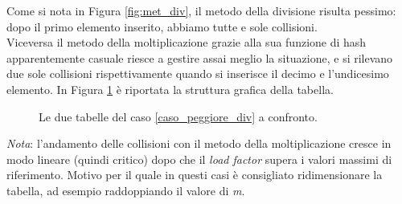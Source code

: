 Come si nota in Figura \ref{fig:met_div}, il metodo della divisione risulta pessimo: dopo il primo elemento inserito, abbiamo tutte e sole collisioni.
\\ Viceversa il metodo della moltiplicazione grazie alla sua funzione di hash apparentemente casuale riesce a gestire assai meglio la situazione, e si rilevano due sole collisioni rispettivamente quando si inserisce il decimo e l'undicesimo elemento. In Figura \ref{fig:tikz:worstcase} è riportata la struttura grafica della tabella.

\begin{figure}[htp]
  
  \caption{Le due tabelle del caso \ref{caso_peggiore_div} a confronto.}
  \label{fig:tikz:worstcase}
\end{figure}

\textit{Nota}: l'andamento delle collisioni con il metodo della moltiplicazione cresce in modo lineare (quindi critico) dopo che il \textit{load factor} supera i valori massimi di riferimento. Motivo per il quale in questi casi è consigliato ridimensionare la tabella, ad esempio raddoppiando il valore di \textit{m}.
